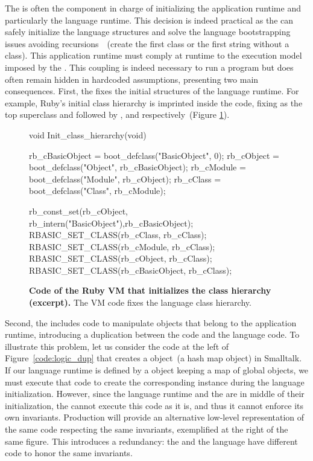 The \VM is often the component in charge of initializing the application runtime and particularly the language runtime. This decision is indeed practical as the \VM can safely initialize the language structures and solve the language bootstrapping issues avoiding recursions~\cite{Kicz91a}~(\eg create the first class or the first string without a class). This application runtime must comply at runtime to the execution model imposed by the \VM. This coupling is indeed necessary to run a program but does often remain hidden in hardcoded assumptions, presenting two main consequences. First, the \VM fixes the initial structures of the language runtime. For example, Ruby's initial class hierarchy is imprinted inside the \VM code, fixing  as the top superclass and followed by ,  and  respectively~(Figure \ref{code:ruby_hierarchy}).

\begin{figure}[ht!]
\begin{code}
void Init_class_hierarchy(void) {
    rb_cBasicObject = boot_defclass("BasicObject", 0);
    rb_cObject = boot_defclass("Object", rb_cBasicObject);
    rb_cModule = boot_defclass("Module", rb_cObject);
    rb_cClass =  boot_defclass("Class",  rb_cModule);

    rb_const_set(rb_cObject, rb_intern("BasicObject"),rb_cBasicObject);
    RBASIC_SET_CLASS(rb_cClass, rb_cClass);
    RBASIC_SET_CLASS(rb_cModule, rb_cClass);
    RBASIC_SET_CLASS(rb_cObject, rb_cClass);
    RBASIC_SET_CLASS(rb_cBasicObject, rb_cClass);
}
\end{code}
\caption{\textbf{Code of the Ruby VM that initializes the class hierarchy (excerpt).} The VM code fixes the language class hierarchy.\label{code:ruby_hierarchy}}
\end{figure}

Second, the \VM includes code to manipulate objects that belong to the application runtime, introducing a duplication between the \VM code and the language code. To illustrate this problem, let us consider the code at the left of Figure~\ref{code:logic_dup} that creates a  object~(a hash map object) in Smalltalk. If our language runtime is defined by a  object keeping \eg a map of global objects, we must execute that code to create the corresponding instance during the language initialization. However, since the language runtime and the \VM are in middle of their initialization, the \VM cannot execute this code as it is, and thus it cannot enforce its own invariants. Production \VMs will provide an alternative low-level representation of the same code respecting the same invariants, exemplified at the right of the same figure. This introduces a redundancy: the \VM and the language have different code to honor the same invariants.


